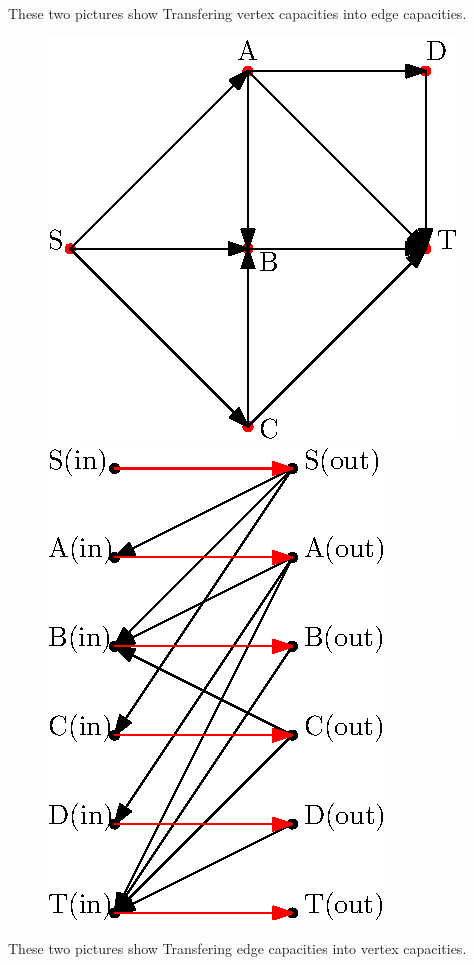 \begin{enumerate}[(1)]
	These two pictures show Transfering vertex capacities into edge capacities. 
	\begin{figure}[!htbp]
		\includegraphics[totalheight=6cm]{source/xzj/pic1.eps}
		\includegraphics[totalheight=6cm]{source/xzj/pic2.eps}
	\end{figure}
	These two pictures show Transfering edge capacities into vertex capacities.
	\begin{figure}[!htbp]

\end{figure}
\end{enumerate}
